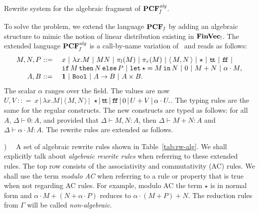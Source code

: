 \documentclass[10pt]{article}
\theoremstyle{plain}
\theoremstyle{definition}
\newcommand{\bor}{\ |\ }
\newcommand{\borsmall}{\,|\,}
\newcommand{\FinVec}{\mbox{\bf FinVec}}
\newcommand{\pair}[1]{{\langle\,{#1}\,\rangle}}
\newcommand{\punit}{{\star}}
\newcommand{\tunit}{{\bf 1}}
\newcommand{\ttrue}{{\tt t}\!{\tt t}}
\newcommand{\ffalse}{{\tt f}\!{\tt f}}
\newcommand{\ifterm}[3]{{{\tt if}\,{#1}\,{\tt then}\,{#2}\,{\tt else}\,{#3}}}
\newcommand{\letunit}[2]{{\tt let}\,\star={#1}\,{\tt in}\,{#2}}
\newcommand{\bit}{{\tt Bool}}
\begin{document}
\begin{table}[t]
    \caption{Rewrite system for the algebraic fragment of
      ${\bf PCF}_{\it f}^{\it alg}$.}
    \label{tab:rw-alg}
\end{table}


To solve the problem, we extend the language ${\bf PCF}_{\it f}$ by adding an
algebraic structure to mimic the notion of linear distribution
existing in ${\FinVec_!}$. The extended language ${\bf PCF}_{\it f}^{\it alg}$
is a call-by-name variation of~\cite{ad08,adv11} and reads as follows:
\[\begin{array}{rl}
  M,N,P ~ {:}{:}{=}~ & 
  x \bor \lambda x.M \bor MN \bor
  \pi_l(M) \bor \pi_r(M) \bor \pair{M,N}\bor\punit\bor
  \ttrue \bor \ffalse \bor\\& \ifterm{M}{N}{P} \bor
  \letunit{M}{N}\bor
  0 \bor M + N \bor \alpha\cdot M,
  \\
  A,B ~ {:}{:}{=}~ &
  \tunit\bor\bit \bor A \to B \bor A \times B.
\end{array}\]
The scalar $\alpha$ ranges over the field.
The values are now
$U,V~{:}{:}{=}~
x \borsmall \lambda x.M\borsmall\pair{M,N}\borsmall$
$\punit\borsmall\ttrue \borsmall \ffalse \borsmall
0 \borsmall U + V \borsmall \alpha\cdot U.
$.
The typing rules are the same for the regular constructs. The new
constructs are typed as follows: for all $A$, $\Delta\vdash 0 : A$, 
and provided that $\Delta\vdash M,N : A$,
then $\Delta\vdash M + N : A$ and $\Delta\vdash \alpha\cdot M : A.$
The rewrite rules are extended as follows.

\smallskip
{})~~ A set of algebraic rewrite rules shown in
Table~\ref{tab:rw-alg}. We shall explicitly talk about {\em algebraic
  rewrite rules} when referring to these extended rules. The top row
consists of the associativity and commutativity (AC) rules. We shall
use the term {\em modulo AC} when referring to a rule or property that
is true when not regarding AC rules. For example, modulo AC the term $\star$ is
in normal form and $\alpha\cdot M+(N+\alpha\cdot P)$
reduces to $\alpha\cdot(M+P)+N$.
The reduction
rules from $\Gamma$ will be called {\em non-algebraic}.
\end{document}
